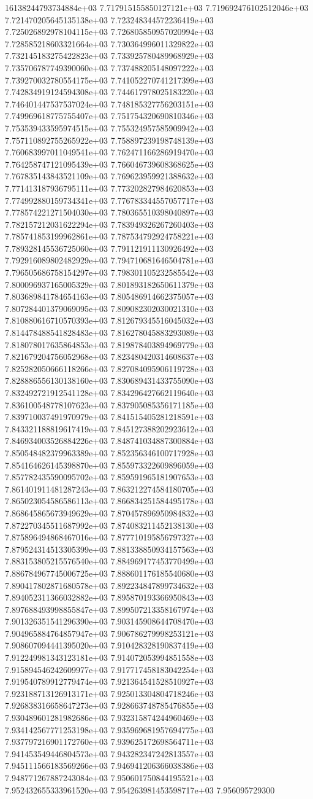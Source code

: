 16138244793734884e+03	7.717915155850127121e+03	7.719692476102512046e+03	7.721470205645135138e+03	7.723248344572236419e+03	7.725026892978104115e+03	7.726805850957020994e+03	7.728585218603321664e+03	7.730364996011329822e+03	7.732145183275422823e+03	7.733925780489968929e+03	7.735706787749390060e+03	7.737488205148097222e+03	7.739270032780554175e+03	7.741052270741217399e+03	7.742834919124594308e+03	7.744617978025183220e+03	7.746401447537537024e+03	7.748185327756203151e+03	7.749969618775755407e+03	7.751754320690810346e+03	7.753539433595974515e+03	7.755324957585909942e+03	7.757110892755265922e+03	7.758897239198748139e+03	7.760683997011049541e+03	7.762471166286919470e+03	7.764258747121095439e+03	7.766046739608368625e+03	7.767835143843521109e+03	7.769623959921388632e+03	7.771413187936795111e+03	7.773202827984620853e+03	7.774992880159734341e+03	7.776783344557057717e+03	7.778574221271504030e+03	7.780365510398040897e+03	7.782157212031622294e+03	7.783949326267260403e+03	7.785741853199962861e+03	7.787534792924758221e+03	7.789328145536725060e+03	7.791121911130926492e+03	7.792916089802482929e+03	7.794710681646504781e+03	7.796505686758154297e+03	7.798301105232585542e+03	7.800096937165005329e+03	7.801893182650611379e+03	7.803689841784654163e+03	7.805486914662375057e+03	7.807284401379069095e+03	7.809082302030021310e+03	7.810880616710570393e+03	7.812679345516045032e+03	7.814478488541828483e+03	7.816278045883293089e+03	7.818078017635864853e+03	7.819878403894969779e+03	7.821679204756052968e+03	7.823480420314608637e+03	7.825282050666118266e+03	7.827084095906119728e+03	7.828886556130138160e+03	7.830689431433755090e+03	7.832492721912541128e+03	7.834296427662119640e+03	7.836100548778107623e+03	7.837905085356171185e+03	7.839710037491970979e+03	7.841515405281218591e+03	7.843321188819617419e+03	7.845127388202923612e+03	7.846934003526884226e+03	7.848741034887300884e+03	7.850548482379963389e+03	7.852356346100717928e+03	7.854164626145398870e+03	7.855973322609896059e+03	7.857782435590095702e+03	7.859591965181907653e+03	7.861401911481287243e+03	7.863212274584180705e+03	7.865023054586586113e+03	7.866834251584495178e+03	7.868645865673949629e+03	7.870457896950984832e+03	7.872270345511687992e+03	7.874083211452138130e+03	7.875896494868467016e+03	7.877710195856797327e+03	7.879524314513305399e+03	7.881338850934157563e+03	7.883153805215576540e+03	7.884969177453770499e+03	7.886784967745006725e+03	7.888601176185540680e+03	7.890417802871680578e+03	7.892234847899734632e+03	7.894052311366032882e+03	7.895870193366950843e+03	7.897688493998855847e+03	7.899507213358167974e+03	7.901326351541296390e+03	7.903145908644708470e+03	7.904965884764857947e+03	7.906786279998253121e+03	7.908607094441395020e+03	7.910428328190837419e+03	7.912249981343123181e+03	7.914072053994851558e+03	7.915894546242609977e+03	7.917717458183042254e+03	7.919540789912779474e+03	7.921364541528510927e+03	7.923188713126913171e+03	7.925013304804718246e+03	7.926838316658647273e+03	7.928663748785476855e+03	7.930489601281982686e+03	7.932315874244960469e+03	7.934142567771253198e+03	7.935969681957694775e+03	7.937797216901172760e+03	7.939625172698564711e+03	7.941453549446804573e+03	7.943282347242813557e+03	7.945111566183569266e+03	7.946941206366038386e+03	7.948771267887243084e+03	7.950601750844195521e+03	7.952432655333961520e+03	7.954263981453598717e+03	7.956095729300